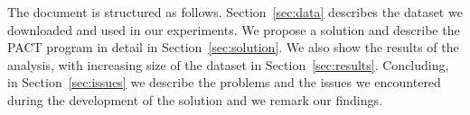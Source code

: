 The document is structured as follows. Section~\ref{sec:data} describes the dataset we downloaded and used in our experiments. We propose a solution and describe the PACT program in detail in Section~\ref{sec:solution}. We also show the results of the analysis, with increasing size of the dataset in Section~\ref{sec:results}. Concluding, in Section~\ref{sec:issues} we describe the problems and the issues we encountered during the development of the solution and we remark our findings.
